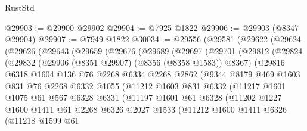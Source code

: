 \begin{lexlean}{RustStd}
\begin{coremodule}
@29903 := @29900 @29902
@29904 := @7925 @1822
@29906 := @29903 (@8347 @29904)
@29907 := @7949 @1822
@30034 := @29556
    (@29581
      (@29622
        (@29624
          (@29626
            (@29643
              (@29659
                (@29676
                  (@29689
                    (@29697
                      (@29701
                        (@29812
                          (@29824
                            (@29832
                              (@29906 (@8351 @29907) (@8356 (@8358 @1583)) @8367)
                              (@29816
                                @6318
                                @1604
                                @136
                                @76
                                @2268
                                @6334
                                @2268
                                @2862
                                (@9344
                                  @8179
                                  @469
                                  @1603
                                  @831
                                  @76
                                  @2268
                                  @6332
                                  @1055
                                  (@11212
                                    @1603
                                    @831
                                    @6332
                                    (@11217
                                      @1601
                                      @1075
                                      @61
                                      @567
                                      @6328
                                      @6331
                                      (@11197
                                        @1601
                                        @61
                                        @6328
                                        (@11202
                                          @1227
                                          @1600
                                          @1411
                                          @61
                                          @2268
                                          @6326
                                          @2027
                                          @1533
                                          (@11212
                                            @1600
                                            @1411
                                            @6326
                                            (@11218
                                              @1599
                                              @61

\end{coremodule}
\end{lexlean}
